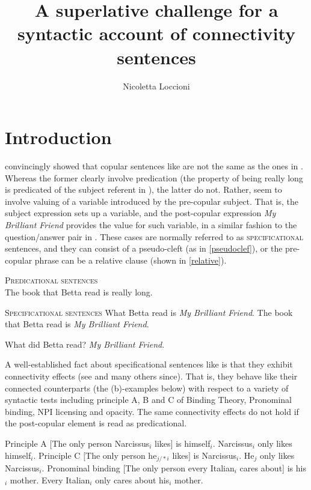 \documentclass[output=paper,colorlinks,citecolor=brown,draft,draftmode]{langscibook}
\author{Nicoletta Loccioni \affiliation{University of California Los Angeles}}
\title{A superlative challenge for a syntactic account of connectivity sentences}
\begin{document}
\maketitle

\section{Introduction}


\cite{higgins1973} convincingly showed that  copular sentences like  are not the same as the ones in . Whereas the former clearly involve predication (the property of being really long is predicated of the subject referent in ), the latter do not. Rather,  seem to involve valuing of a variable introduced by the pre-copular subject. That is, the subject expression sets up a variable, and the post-copular expression \textit{My Brilliant Friend} provides the value for such variable, in a similar fashion to the question/answer pair in . These cases are normally referred to as \textsc{specificational} sentences, and they can consist of a  pseudo-cleft (as in \ref{pseudoclef}), or the pre-copular phrase can be a relative clause (shown in  \ref{relative}).%

\ea \label{predicational}\textsc{Predicational sentences}\\
The book that Betta read is really long.
\z

\ea \label{specgen}\textsc{Specificational sentences}
\ea \label{pseudoclef}What Betta read is \textit{My Brilliant Friend}. %
\ex \label{relative}The book that Betta read is \textit{My Brilliant Friend}. %
\z
\z

\ea \label{questionanswer}
\ea What did Betta read?
\ex  \textit{My Brilliant Friend}.
\z
\z

A well-established fact about specificational sentences like  is that they exhibit connectivity effects (see \citealt{akmajian1970, higgins1973} and many others since). That is, they behave like their connected counterparts (the (b)-examples below) with respect to a variety of syntactic tests including principle A, B and C of Binding Theory, Pronominal binding, NPI licensing and opacity.  The same connectivity effects do not hold if the post-copular element is read as predicational.

\ea  Principle A
    \ea\label{anaphor}$[$The only person Narcissus$_i$ likes$]$ is himself$_i$.
    \ex  Narcissus$_i$ only likes himself$_i$.
    \z
\ex \label{principle C}Principle C
    \ea $[$The only person he$_{j/*i}$ likes$]$ is Narcissus$_i$.
    \ex  He$_j$ only likes Narcissus$_i$.
    \z
\ex \label{pronominalbind}Pronominal binding
    \ea $[$The only person every Italian$_i$ cares about$]$ is his$_i$ mother.
    \ex  Every Italian$_i$ only cares about his$_i$ mother.  \hfill
    \z
\z
\end{document}
